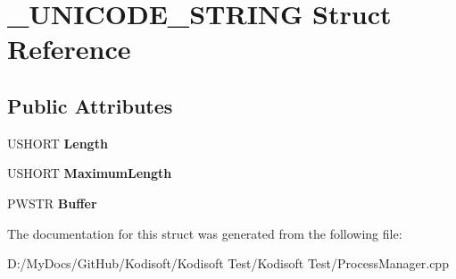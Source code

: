 \hypertarget{struct___u_n_i_c_o_d_e___s_t_r_i_n_g}{\section{\+\_\+\+U\+N\+I\+C\+O\+D\+E\+\_\+\+S\+T\+R\+I\+N\+G Struct Reference}
\label{struct___u_n_i_c_o_d_e___s_t_r_i_n_g}
}
\subsection*{Public Attributes}
\begin{DoxyCompactItemize}
\item 
\hypertarget{struct___u_n_i_c_o_d_e___s_t_r_i_n_g_a3ebb6a85103954fd7fc325ba30c54008}{U\+S\+H\+O\+R\+T {\bfseries Length}}\label{struct___u_n_i_c_o_d_e___s_t_r_i_n_g_a3ebb6a85103954fd7fc325ba30c54008}

\item 
\hypertarget{struct___u_n_i_c_o_d_e___s_t_r_i_n_g_ae0487ecc173e55918bcee834bd3d107b}{U\+S\+H\+O\+R\+T {\bfseries Maximum\+Length}}\label{struct___u_n_i_c_o_d_e___s_t_r_i_n_g_ae0487ecc173e55918bcee834bd3d107b}

\item 
\hypertarget{struct___u_n_i_c_o_d_e___s_t_r_i_n_g_afbc2ba2b7be88d0118e683a2eb289795}{P\+W\+S\+T\+R {\bfseries Buffer}}\label{struct___u_n_i_c_o_d_e___s_t_r_i_n_g_afbc2ba2b7be88d0118e683a2eb289795}

\end{DoxyCompactItemize}


The documentation for this struct was generated from the following file\+:\begin{DoxyCompactItemize}
\item 
D\+:/\+My\+Docs/\+Git\+Hub/\+Kodisoft/\+Kodisoft Test/\+Kodisoft Test/Process\+Manager.\+cpp\end{DoxyCompactItemize}
